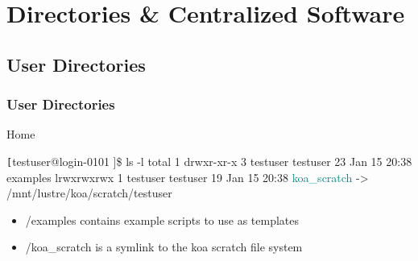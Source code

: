  
\section[Directories \& Centralized Software]{Directories \& Centralized Software }
\subsection{User Directories}
\begin{frame}[fragile]
\frametitle{User Directories}
\begin{block}{Home}
\begin{semiverbatim}\tiny \texttt
[testuser@login-0101 \ctilde]\$ ls -l 
total 1
drwxr-xr-x 3 testuser testuser 23 Jan 15 20:38 examples
lrwxrwxrwx 1 testuser testuser 19 Jan 15 20:38 \textcolor{teal}{koa_scratch} -> /mnt/lustre/koa/scratch/testuser
\end{semiverbatim}
\end{block}
\begin{itemize}
		\item \ctilde{}/examples contains example scripts to use as templates
		\item \ctilde{}/koa\_scratch is a symlink to the koa scratch file system
\end{itemize}
\end{frame}


